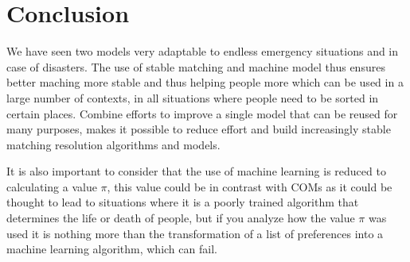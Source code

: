 \section{Conclusion}

We have seen two models very adaptable to endless emergency situations and in case of disasters.
The use of stable matching and machine model thus ensures better maching more stable and thus helping people more which can be used in a large number of contexts, in all situations where people need to be sorted in certain places.
Combine efforts to improve a single model that can be reused for many purposes, makes it possible to reduce effort and build increasingly stable matching resolution algorithms and models.

It is also important to consider that the use of machine learning is reduced to calculating a value \(\pi\), this value could be in contrast with COMs as it could be thought to lead to situations where it is a poorly trained algorithm that determines the life or death of people, but if you analyze how the value \(\pi\) was used it is nothing more than the transformation of a list of preferences into a machine learning algorithm, which can fail.
